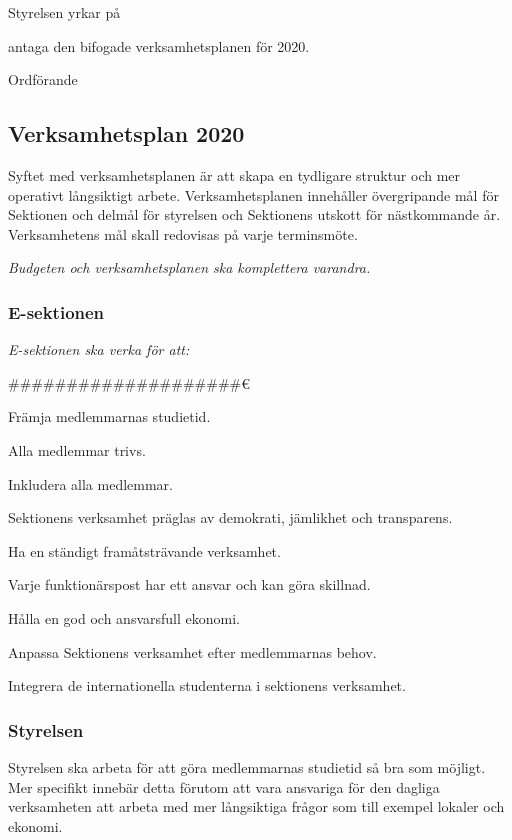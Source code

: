 \documentclass[../_main/handlingar.tex]{subfiles}
\begin{document}

Styrelsen yrkar på

\begin{attsatser}
    \att antaga den bifogade verksamhetsplanen för 2020.
\end{attsatser}

\begin{signatures}{1}
    \ist
    \signature{\ordf}{Ordförande}
\end{signatures}

\subsection*{Verksamhetsplan 2020}
Syftet med verksamhetsplanen är att skapa en tydligare struktur och mer operativt långsiktigt arbete. Verksamhetsplanen innehåller övergripande mål för Sektionen och delmål för styrelsen och Sektionens utskott för nästkommande år. Verksamhetens mål skall redovisas på varje terminsmöte.

\emph{Budgeten och verksamhetsplanen ska komplettera varandra.}

\subsubsection*{E-sektionen}
\emph{E-sektionen ska verka för att:}
\begin{dashlist}
	\item ####################€%
    \item Främja medlemmarnas studietid. 
    \item Alla medlemmar trivs.
    \item Inkludera alla medlemmar. 
    \item Sektionens verksamhet präglas av demokrati, jämlikhet och transparens.
    \item Ha en ständigt framåtsträvande verksamhet. 
    \item Varje funktionärspost har ett ansvar och kan göra skillnad. 
    \item Hålla en god och ansvarsfull ekonomi. 
    \item Anpassa Sektionens verksamhet efter medlemmarnas behov.
    \item Integrera de internationella studenterna i sektionens verksamhet.
\end{dashlist}

\subsubsection*{Styrelsen}
Styrelsen ska arbeta för att göra medlemmarnas studietid så bra som möjligt. Mer specifikt innebär detta förutom att vara ansvariga för den dagliga verksamheten att arbeta med mer långsiktiga frågor som till exempel lokaler och ekonomi.
\end{document}
